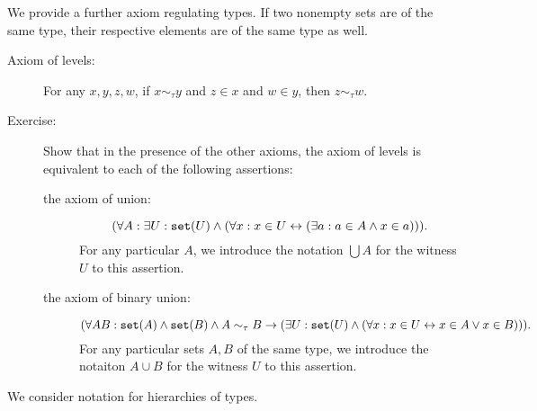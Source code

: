 \documentclass[12pt]{book}
\begin{document}
We provide a further axiom regulating types.  If two nonempty sets are of the same type, their respective elements are of the same type as well.

\begin{description}

\item[Axiom of levels:]  For any $x,y,z,w$, if $x \sim_\tau y$ and $z \in x$ and $w \in y$, then $z \sim_\tau w$.

\item[Exercise:]  Show that in the presence of the other axioms, the axiom of levels is equivalent to each of the following assertions:

\begin{description}

\item  [the axiom of union:]  $$(\forall A:\exists U:{\tt set}(U) \wedge (\forall x:x \in U \leftrightarrow (\exists a:a \in A \wedge x \in a))).$$  For any particular $A$, we introduce the notation $\bigcup A$ for the witness $U$ to this assertion.

\item[the axiom of binary union:]  $$(\forall AB: {\tt set}(A) \wedge {\tt set}(B) \wedge A \sim_\tau B \rightarrow (\exists U:{\tt set}(U) \wedge (\forall x:x \in U \leftrightarrow x \in A \vee x \in B))).$$  For any particular sets $A,B$ of the same type, we introduce the notaiton $A \cup B$ for the witness $U$ to this assertion.

\end{description}

\end{description}

We consider notation for hierarchies of types.
\end{document}
